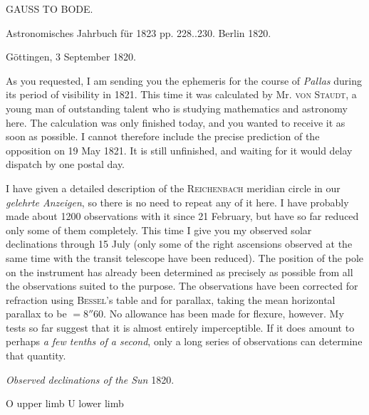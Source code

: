 \clearpage
{}
\hypertarget{native-438-part-lower}{}
\begin{center}
{\large GAUSS TO BODE.}

Astronomisches Jahrbuch für 1823 pp. 228..230. Berlin 1820.
\end{center}

\hfill Göttingen, 3 September 1820.

\par\indent As you requested, I am sending you the ephemeris for the course of \emph{Pallas} during its period of visibility in 1821. This time it was calculated by Mr. \textsc{von Staudt}, a young man of outstanding talent who is studying mathematics and astronomy here. The calculation was only finished today, and you wanted to receive it as soon as possible. I cannot therefore include the precise prediction of the opposition on 19 May 1821. It is still unfinished, and waiting for it would delay dispatch by one postal day.

I have given a detailed description of the \textsc{Reichenbach} meridian circle in our \textit{gelehrte Anzeigen}, so there is no need to repeat any of it here. I have probably made about 1200 observations with it since 21 February, but have so far reduced only some of them completely. This time I give you my observed solar declinations through 15 July (only some of the right ascensions observed at the same time with the transit telescope have been reduced). The position of the pole on the instrument has already been determined as precisely as possible from all the observations suited to the purpose. The observations have been corrected for refraction using \textsc{Bessel}’s table and for parallax, taking the mean horizontal parallax to be $=8''60$. No allowance has been made for flexure, however. My tests so far suggest that it is almost entirely imperceptible. If it does amount to perhaps \emph{a few tenths of a second}, only a long series of observations can determine that quantity.


\begin{center}
\emph{Observed declinations of the Sun} 1820.

O upper limb \quad U lower limb
\end{center}

